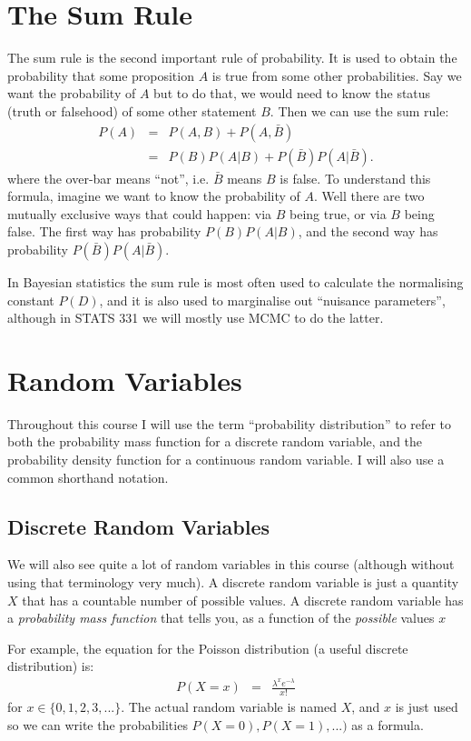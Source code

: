 \section{The Sum Rule}
The sum rule is the second important rule of probability. It is used to obtain
the probability that some proposition $A$ is true from some other
probabilities. Say we want the probability of $A$ but to do that, we would need
to know the status (truth or falsehood) of some other statement $B$. Then we
can use the sum rule:
\begin{eqnarray}
P(A) &=& P(A, B) + P(A, \bar{B})\\
&=& P(B)P(A|B) + P(\bar{B})P(A|\bar{B}).
\end{eqnarray}
where the over-bar means ``not'', i.e. $\bar{B}$ means $B$ is false. To understand
this formula, imagine we want to know the probability of $A$. Well there are
two mutually exclusive ways that could happen: via $B$ being true, or via $B$
being false. The first way has probability $P(B)P(A|B)$, and the second way
has probability $P(\bar{B})P(A|\bar{B})$.

In Bayesian statistics the sum rule is most often used to calculate the
normalising constant $P(D)$, and it is also used to marginalise out ``nuisance
parameters'', although in STATS 331 we will mostly use MCMC to do the latter.

\section{Random Variables}
Throughout this course I will use the term ``probability distribution'' to
refer to both the probability mass function for a discrete random variable, and
the probability density function for a continuous random variable. I will also
use a common shorthand notation.

\subsection{Discrete Random Variables}
We will also see quite a lot of random variables in this course (although
without using that terminology very much). A discrete
random variable is just a quantity $X$ that has a countable number of possible
values. A discrete random variable has a {\it probability mass function}
that tells you, as a function of the {\it possible} values $x$

For example, the equation for the Poisson distribution (a useful discrete
distribution) is:
\begin{eqnarray}
P(X=x) &=& \frac{\lambda^x e^{-\lambda}}{x!}
\end{eqnarray}
for $x \in \{0, 1, 2, 3, ...\}$. The actual random variable is named $X$, and
$x$ is just used so we can write the probabilities $P(X=0), P(X=1), ...)$ as
a formula.

